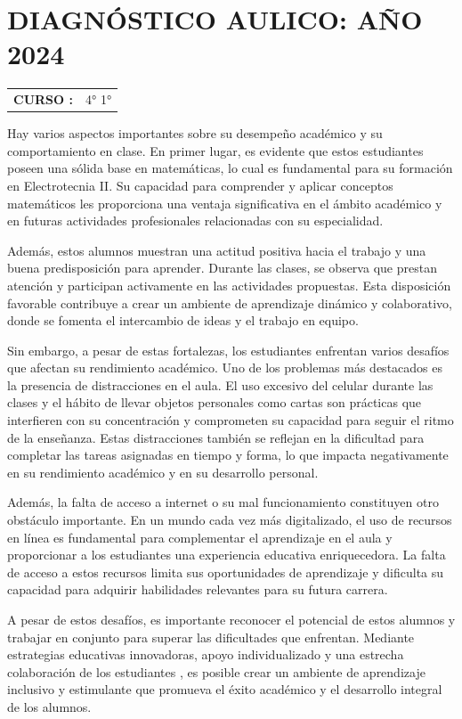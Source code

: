 \documentclass[planificacion2024.tex]{subfiles}
\begin{document}
\section*{DIAGNÓSTICO AULICO: AÑO 2024}
\begin{tabular}{r l}
\textbf{CURSO :}& 4° 1°\\
\end{tabular}

\vspace{1cm}
Hay varios aspectos importantes sobre su desempeño académico y su comportamiento en clase. En primer lugar, es evidente que estos estudiantes poseen una sólida base en matemáticas, lo cual es fundamental para su formación en Electrotecnia II. Su capacidad para comprender y aplicar conceptos matemáticos les proporciona una ventaja significativa en el ámbito académico y en futuras actividades profesionales relacionadas con su especialidad.

Además, estos alumnos muestran una actitud positiva hacia el trabajo y una buena predisposición para aprender. Durante las clases, se observa que prestan atención y participan activamente en las actividades propuestas. Esta disposición favorable contribuye a crear un ambiente de aprendizaje dinámico y colaborativo, donde se fomenta el intercambio de ideas y el trabajo en equipo.

Sin embargo, a pesar de estas fortalezas, los estudiantes enfrentan varios desafíos que afectan su rendimiento académico. Uno de los problemas más destacados es la presencia de distracciones en el aula. El uso excesivo del celular durante las clases y el hábito de llevar objetos personales como cartas son prácticas que interfieren con su concentración y comprometen su capacidad para seguir el ritmo de la enseñanza. Estas distracciones también se reflejan en la dificultad para completar las tareas asignadas en tiempo y forma, lo que impacta negativamente en su rendimiento académico y en su desarrollo personal.

Además, la falta de acceso a internet o su mal funcionamiento constituyen otro obstáculo importante. En un mundo cada vez más digitalizado, el uso de recursos en línea es fundamental para complementar el aprendizaje en el aula y proporcionar a los estudiantes una experiencia educativa enriquecedora. La falta de acceso a estos recursos limita sus oportunidades de aprendizaje y dificulta su capacidad para adquirir habilidades relevantes para su futura carrera.

A pesar de estos desafíos, es importante reconocer el potencial de estos alumnos y trabajar en conjunto para superar las dificultades que enfrentan. Mediante estrategias educativas innovadoras, apoyo individualizado y una estrecha colaboración de los estudiantes , es posible crear un ambiente de aprendizaje inclusivo y estimulante que promueva el éxito académico y el desarrollo integral de los alumnos.
\end{document}
